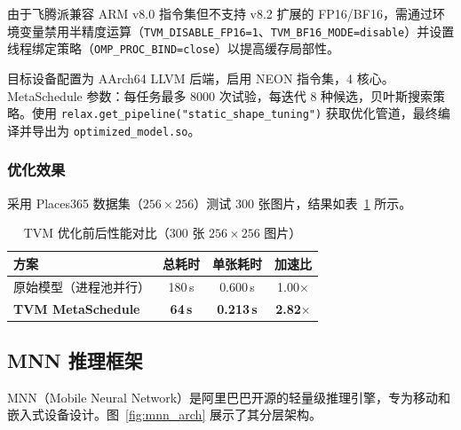 \documentclass[lang=cn,a4paper,newtx,citestyle=gb7714-2015,bibstyle=gb7714-2015]{elegantpaper}
\begin{document}
由于飞腾派兼容 ARM v8.0 指令集但不支持 v8.2 扩展的 FP16/BF16，需通过环境变量禁用半精度运算（\texttt{TVM\_DISABLE\_FP16=1}、\texttt{TVM\_BF16\_MODE=disable}）并设置线程绑定策略（\texttt{OMP\_PROC\_BIND=close}）以提高缓存局部性。

目标设备配置为 AArch64 LLVM 后端，启用 NEON 指令集，4 核心。MetaSchedule 参数：每任务最多 8000 次试验，每迭代 8 种候选，贝叶斯搜索策略。使用 \texttt{relax.get\_pipeline("static\_shape\_tuning")} 获取优化管道，最终编译并导出为 \texttt{optimized\_model.so}。

\subsubsection{优化效果}

采用 Places365 数据集（$256 \times 256$）测试 300 张图片，结果如表~\ref{tab:tvm_perf} 所示。

\begin{table}[htbp]
\centering
\caption{TVM 优化前后性能对比（300 张 $256 \times 256$ 图片）}
\label{tab:tvm_perf}
\begin{tabular}{lccc}
  \toprule
  \textbf{方案} & \textbf{总耗时} & \textbf{单张耗时} & \textbf{加速比} \\
  \midrule
  原始模型（进程池并行） & 180\,s & 0.600\,s & 1.00$\times$ \\
  \textbf{TVM MetaSchedule} & \textbf{64\,s} & \textbf{0.213\,s} & \textbf{2.82$\times$} \\
  \bottomrule
\end{tabular}
\end{table}

\subsection{MNN 推理框架}

MNN（Mobile Neural Network）是阿里巴巴开源的轻量级推理引擎\cite{mnn_walle}，专为移动和嵌入式设备设计。图~\ref{fig:mnn_arch} 展示了其分层架构。
\end{document}
